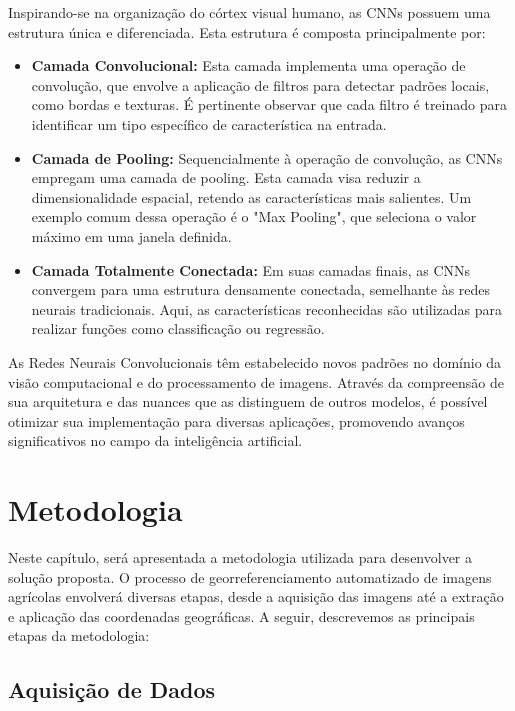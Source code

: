 \documentclass[conference]{IEEEtran}
\begin{document}
Inspirando-se na organização do córtex visual humano, as CNNs possuem uma estrutura única e 
diferenciada. Esta estrutura é composta principalmente por:
\begin{itemize}
    \item {\textbf{Camada Convolucional:}}
    Esta camada implementa uma operação de convolução, que envolve a aplicação de filtros para 
    detectar padrões locais, como bordas e texturas. É pertinente observar que cada filtro é treinado 
    para identificar um tipo específico de característica na entrada.

    \item {\textbf{Camada de Pooling:}}
    Sequencialmente à operação de convolução, as CNNs empregam uma camada de pooling. Esta camada 
    visa reduzir a dimensionalidade espacial, retendo as características mais salientes. 
    Um exemplo comum dessa operação é o "Max Pooling", que seleciona o valor máximo em uma janela definida.

    \item {\textbf{Camada Totalmente Conectada:}}
     Em suas camadas finais, as CNNs convergem para uma estrutura densamente conectada, semelhante 
     às redes neurais tradicionais. Aqui, as características reconhecidas são utilizadas para realizar 
     funções como classificação ou regressão.
\end{itemize}

As Redes Neurais Convolucionais têm estabelecido novos padrões no domínio da visão computacional e 
do processamento de imagens. Através da compreensão de sua arquitetura e das nuances que as 
distinguem de outros modelos, é possível otimizar sua implementação para diversas aplicações, 
promovendo avanços significativos no campo da inteligência artificial.

\section{Metodologia}
Neste capítulo, será apresentada a metodologia utilizada para desenvolver a solução proposta. 
O processo de georreferenciamento automatizado de imagens agrícolas envolverá diversas etapas, 
desde a aquisição das imagens até a extração e aplicação das coordenadas geográficas. 
A seguir, descrevemos as principais etapas da metodologia:

\subsection{Aquisição de Dados}
\end{document}
